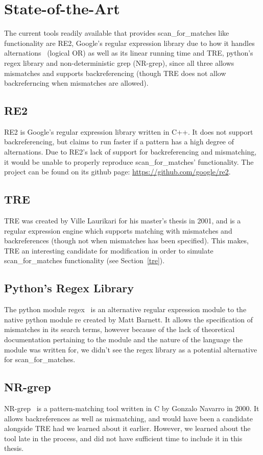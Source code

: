 \section{State-of-the-Art}
The current tools readily available that provides scan\_for\_matches like 
functionality are RE2, Google's regular expression library due to 
how it handles alternations~\cite{re2java} (logical OR) as well as its linear 
running time and TRE, python's regex library and non-deterministic grep 
(NR-grep), since all three allows mismatches and supports backreferencing 
(though TRE does not allow backreferncing when mismatches are allowed). 
 \subsection{RE2} %
 RE2 is Google's regular expression library written in C++. It does not 
 support backreferencing, but claims to run faster if a pattern has a high degree 
 of alternations. Due to RE2's lack of support for backreferencing and mismatching, 
 it would be unable to properly reproduce scan\_for\_matches' functionality. 
 The project can be found on its github page: \url{https://github.com/google/re2}.
 \subsection{TRE} %
 TRE was created by Ville Laurikari for his master's thesis in 
 2001\cite{LaurikariComplex}, and is a regular expression engine which supports 
 matching with mismatches and backreferences (though not when mismatches has 
 been specified). This makes, TRE an interesting candidate for modification in 
 order to simulate scan\_for\_matches functionality (see Section~\ref{tre}).
 \subsection{Python's Regex Library} %
 The python module regex~\cite{pythonregex} is an alternative regular expression 
 module to the native python module re created by Matt Barnett. It allows the 
 specification of mismatches in its search terms, however because of the lack 
 of theoretical documentation pertaining to the module and the nature of 
 the language the module was written for, we didn't see the regex library as 
 a potential alternative for scan\_for\_matches. 
 \subsection{NR-grep}
 NR-grep~\cite{Navarro00nr-grep:a} is a pattern-matching tool written 
 in C by Gonzalo Navarro in 2000. It allows backreferences as well as mismatching, 
 and would have been a candidate alongside TRE had 
 we learned about it earlier. However, we learned about the tool 
 late in the process, and did not have sufficient time to include it in this thesis.
